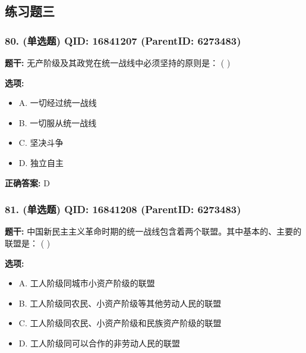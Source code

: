 \documentclass[12pt,UTF8]{ctexart}
\begin{document}
\subsection*{练习题三}

\subsubsection*{80. (单选题) \small QID: 16841207 (ParentID: 6273483)}

\textbf{题干:}
无产阶级及其政党在统一战线中必须坚持的原则是： ( )



\textbf{选项:}
\begin{itemize}[leftmargin=*]

  \item A. 一切经过统一战线

  \item B. 一切服从统一战线

  \item C. 坚决斗争

  \item D. 独立自主

\end{itemize}

\textbf{正确答案:}
D

\vspace{0.3em}\hrulefill\vspace{0.7em}

\subsubsection*{81. (单选题) \small QID: 16841208 (ParentID: 6273483)}

\textbf{题干:}
中国新民主主义革命时期的统一战线包含着两个联盟。其中基本的、主要的联盟是： ( )



\textbf{选项:}
\begin{itemize}[leftmargin=*]

  \item A. 工人阶级同城市小资产阶级的联盟

  \item B. 工人阶级同农民、小资产阶级等其他劳动人民的联盟

  \item C. 工人阶级同农民、小资产阶级和民族资产阶级的联盟

  \item D. 工人阶级同可以合作的非劳动人民的联盟

\end{itemize}
\end{document}
